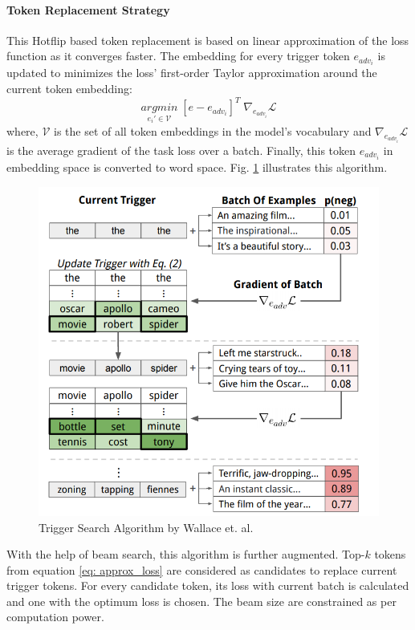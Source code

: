 \documentclass[12pt]{report}
\begin{document}
\begin{spacing}{1.5}
\paragraph{Token Replacement Strategy}
This Hotflip based token replacement is based on linear approximation of the loss function as it converges faster.
The embedding for every trigger token $e_{adv_i}$ is updated to minimizes the loss’ first-order Taylor approximation around the current token embedding:
\begin{equation}
  \label{eq: approx_loss}
  \underset{e_{i}' \in \mathcal{V}}{argmin} \; [e -  e_{adv_i}]^T \; \nabla_{e_{adv_i}} \mathcal{L}
\end{equation}
where, $\mathcal{V}$ is the set of all token embeddings in the model’s vocabulary and $\nabla_{e_{adv_i}} \mathcal{L}$ is the average gradient of the task loss over a batch.
Finally, this token $e_{adv_i}$ in embedding space is converted to word space. Fig. \ref{trigger_algo} illustrates this algorithm.

\begin{figure}[!h]
  \centering
  \includegraphics[width=0.8\linewidth]{./img/trigger_algo.png}
  \caption{Trigger Search Algorithm by Wallace et. al. \cite{wallace2019}}
  \label{trigger_algo}
\end{figure}

With the help of beam search, this algorithm is further augmented. Top-$k$ tokens from equation \ref{eq: approx_loss} are considered as candidates to replace current trigger tokens. For every candidate token, its loss with current batch is calculated and one with the optimum loss is chosen. The beam size are constrained as per computation power.


\end{spacing}
\end{document}
